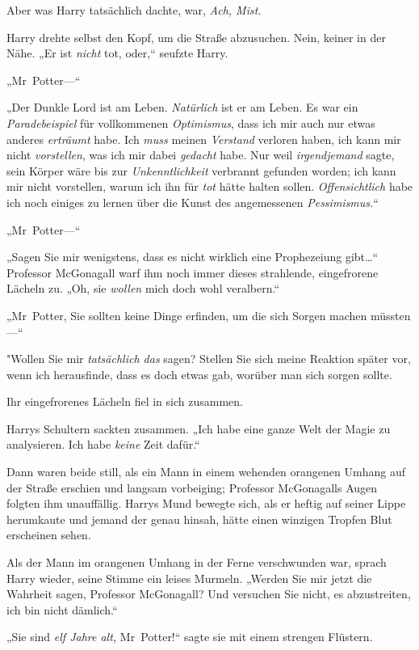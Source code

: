{Aber was Harry tatsächlich dachte, war, \emph{Ach, Mist.}

Harry drehte selbst den Kopf, um die Straße abzusuchen. Nein, keiner in der Nähe. „Er ist \emph{nicht} tot, oder,“ seufzte Harry.

„Mr~Potter—“

„Der Dunkle Lord ist am Leben. \emph{Natürlich} ist er am Leben. Es war ein \emph{Paradebeispiel} für vollkommenen \emph{Optimismus}, dass ich mir auch nur etwas anderes \emph{erträumt} habe. Ich \emph{muss} meinen \emph{Verstand} verloren haben, ich kann mir nicht \emph{vorstellen}, was ich mir dabei \emph{gedacht} habe. Nur weil \emph{irgendjemand} sagte, sein Körper wäre bis zur \emph{Unkenntlichkeit} verbrannt gefunden worden; ich kann mir nicht vorstellen, warum ich ihn für \emph{tot} hätte halten sollen. \emph{Offensichtlich} habe ich noch einiges zu lernen über die Kunst des angemessenen \emph{Pessimismus.}“

„Mr~Potter—“

„Sagen Sie mir wenigstens, dass es nicht wirklich eine Prophezeiung gibt…“ Professor McGonagall warf ihm noch immer dieses strahlende, eingefrorene Lächeln zu. „Oh, sie \emph{wollen} mich doch wohl veralbern.“

„Mr~Potter, Sie sollten keine Dinge erfinden, um die sich Sorgen machen müssten—“

"Wollen Sie mir \emph{tatsächlich das} sagen? Stellen Sie sich meine Reaktion später vor, wenn ich herausfinde, dass es doch etwas gab, worüber man sich sorgen sollte.

Ihr eingefrorenes Lächeln fiel in sich zusammen.

Harrys Schultern sackten zusammen. „Ich habe eine ganze Welt der Magie zu analysieren. Ich habe \emph{keine} Zeit dafür.“

Dann waren beide still, als ein Mann in einem wehenden orangenen Umhang auf der Straße erschien und langsam vorbeiging; Professor McGonagalls Augen folgten ihm unauffällig. Harrys Mund bewegte sich, als er heftig auf seiner Lippe herumkaute und jemand der genau hinsah, hätte einen winzigen Tropfen Blut erscheinen sehen.

Als der Mann im orangenen Umhang in der Ferne verschwunden war, sprach Harry wieder, seine Stimme ein leises Murmeln. „Werden Sie mir jetzt die Wahrheit sagen, Professor McGonagall? Und versuchen Sie nicht, es abzustreiten, ich bin nicht dämlich.“

„Sie sind \emph{elf Jahre alt,} Mr~Potter!“ sagte sie mit einem strengen Flüstern.

}
